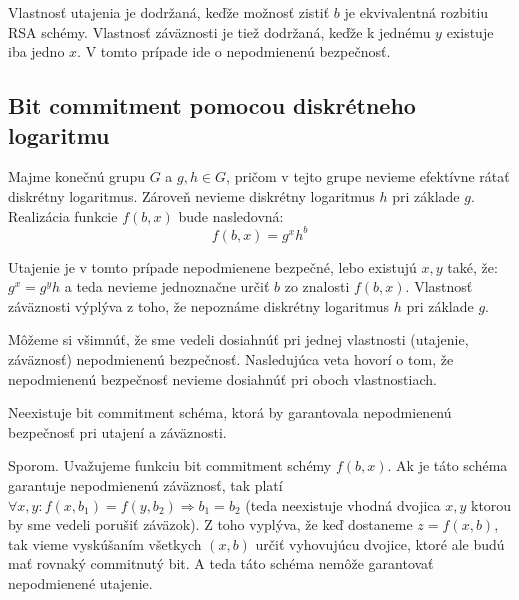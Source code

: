 Vlastnosť utajenia je dodržaná, keďže možnosť zistiť $b$ je ekvivalentná rozbitiu RSA schémy.
Vlastnosť záväznosti je tiež dodržaná, keďže k jednému $y$ existuje iba jedno $x$. V tomto prípade ide o nepodmienenú bezpečnosť.

\subsection{Bit commitment pomocou diskrétneho logaritmu}
Majme konečnú grupu $G$ a $g, h \in G$, pričom v tejto grupe nevieme efektívne rátať diskrétny logaritmus. Zároveň
nevieme diskrétny logaritmus $h$ pri základe $g$.  Realizácia funkcie $f(b,x)$ bude nasledovná: $$f(b,x) = g^x h^b$$

Utajenie je v tomto prípade nepodmienene bezpečné, lebo existujú $x, y$ také, že: $g^x = g^y h$ a teda nevieme jednoznačne
určiť $b$ zo znalosti $f(b,x)$.
Vlastnosť záväznosti výplýva z toho, že nepoznáme diskrétny logaritmus $h$ pri základe $g$.

Môžeme si všimnúť, že sme vedeli dosiahnúť pri jednej vlastnosti (utajenie, záväznosť) nepodmienenú bezpečnosť.
Nasledujúca veta hovorí o tom, že nepodmienenú bezpečnosť nevieme dosiahnúť pri oboch vlastnostiach.

\begin{veta}
Neexistuje bit commitment schéma, ktorá by garantovala nepodmienenú bezpečnosť pri utajení a záväznosti.
\end{veta}

\begin{dokaz}
Sporom. 
Uvažujeme funkciu bit commitment schémy $f(b,x)$. Ak je táto schéma garantuje nepodmienenú záväznosť, tak
platí $\forall x, y\colon f(x,b_1) = f(y,b_2) \Rightarrow b_1 = b_2$ (teda neexistuje vhodná dvojica
$x, y$ ktorou by sme vedeli porušiť záväzok). Z toho vyplýva, že keď dostaneme $z = f(x,b)$, tak vieme 
vyskúšaním všetkych $(x,b)$ určiť vyhovujúcu dvojice, ktoré ale budú mať rovnaký commitnutý bit.
A teda táto schéma nemôže garantovať nepodmienené utajenie.
\end{dokaz}


